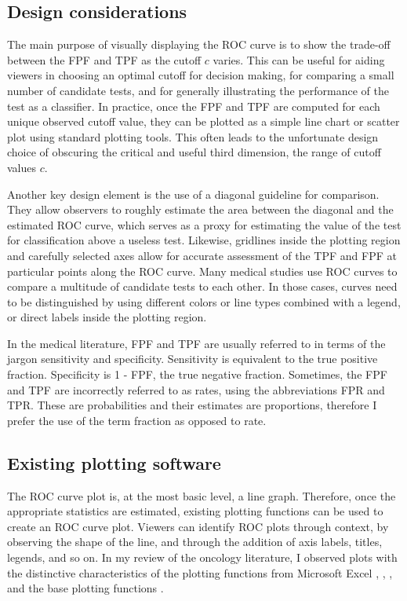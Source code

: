 \documentclass[codesnippet]{jss}
\begin{document}
\subsection{Design considerations}\label{design-considerations}

The main purpose of visually displaying the ROC curve is to show the
trade-off between the FPF and TPF as the cutoff \(c\) varies. This can
be useful for aiding viewers in choosing an optimal cutoff for decision
making, for comparing a small number of candidate tests, and for
generally illustrating the performance of the test as a classifier. In
practice, once the FPF and TPF are computed for each unique observed
cutoff value, they can be plotted as a simple line chart or scatter plot
using standard plotting tools. This often leads to the unfortunate
design choice of obscuring the critical and useful third dimension, the
range of cutoff values \(c\).

Another key design element is the use of a diagonal guideline for
comparison. They allow observers to roughly estimate the area between
the diagonal and the estimated ROC curve, which serves as a proxy for
estimating the value of the test for classification above a useless
test. Likewise, gridlines inside the plotting region and carefully
selected axes allow for accurate assessment of the TPF and FPF at
particular points along the ROC curve. Many medical studies use ROC
curves to compare a multitude of candidate tests to each other. In those
cases, curves need to be distinguished by using different colors or line
types combined with a legend, or direct labels inside the plotting
region.

In the medical literature, FPF and TPF are usually referred to in terms
of the jargon sensitivity and specificity. Sensitivity is equivalent to
the true positive fraction. Specificity is 1 - FPF, the true negative
fraction. Sometimes, the FPF and TPF are incorrectly referred to as
rates, using the abbreviations FPR and TPR. These are probabilities and
their estimates are proportions, therefore I prefer the use of the term
fraction as opposed to rate.

\subsection{Existing plotting
software}\label{existing-plotting-software}

The ROC curve plot is, at the most basic level, a line graph. Therefore,
once the appropriate statistics are estimated, existing plotting
functions can be used to create an ROC curve plot. Viewers can identify
ROC plots through context, by observing the shape of the line, and
through the addition of axis labels, titles, legends, and so on. In my
review of the oncology literature, I observed plots with the distinctive
characteristics of the plotting functions from Microsoft Excel
\citep{excel},  \citep{sas},  \citep{spss},
and the base  plotting functions \citep{arr}.
\end{document}

